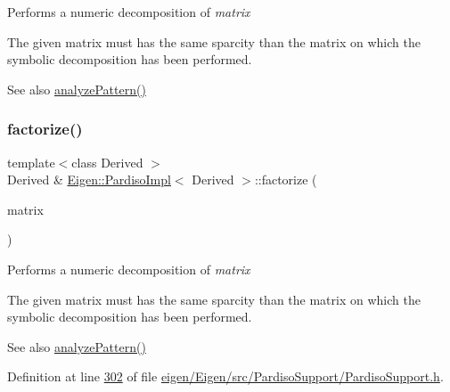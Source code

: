 Performs a numeric decomposition of {\itshape matrix} 

The given matrix must has the same sparcity than the matrix on which the symbolic decomposition has been performed.

\begin{DoxySeeAlso}{See also}
\hyperlink{class_eigen_1_1_pardiso_impl_af1773ce06014b55a69cd42daf34eeec4}{analyze\+Pattern()} 
\end{DoxySeeAlso}
\mbox{\label{class_eigen_1_1_pardiso_impl_a6a4c092c5fb581a946d3c4e5ec347dfb}} 
\subsubsection{\texorpdfstring{factorize()}{factorize()}\hspace{0.1cm}{\footnotesize\ttfamily [2/2]}}
{\footnotesize\ttfamily template$<$class Derived $>$ \\
Derived \& \hyperlink{class_eigen_1_1_pardiso_impl}{Eigen\+::\+Pardiso\+Impl}$<$ Derived $>$\+::factorize (\begin{DoxyParamCaption}\item[{const Matrix\+Type \&}]{matrix }\end{DoxyParamCaption})}

Performs a numeric decomposition of {\itshape matrix} 

The given matrix must has the same sparcity than the matrix on which the symbolic decomposition has been performed.

\begin{DoxySeeAlso}{See also}
\hyperlink{class_eigen_1_1_pardiso_impl_af1773ce06014b55a69cd42daf34eeec4}{analyze\+Pattern()} 
\end{DoxySeeAlso}


Definition at line \hyperlink{eigen_2_eigen_2src_2_pardiso_support_2_pardiso_support_8h_source_l00302}{302} of file \hyperlink{eigen_2_eigen_2src_2_pardiso_support_2_pardiso_support_8h_source}{eigen/\+Eigen/src/\+Pardiso\+Support/\+Pardiso\+Support.\+h}.

\mbox{\label{class_eigen_1_1_pardiso_impl_a7dce1175518593e33d32e30ab0ffee3b}} 
